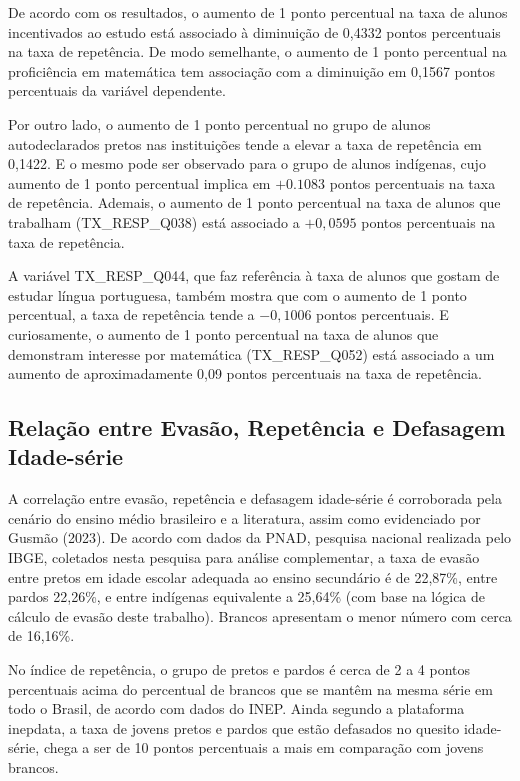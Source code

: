 \documentclass[english, spanish, brazilian]{RBIEarticle} %
\begin{document}
De acordo com os resultados, o aumento de 1 ponto percentual na taxa de alunos incentivados ao estudo está associado à diminuição de 0,4332 pontos percentuais na taxa de repetência. De modo semelhante, o aumento de 1 ponto percentual na proficiência em matemática tem associação com a diminuição em 0,1567 pontos percentuais da variável dependente.

Por outro lado, o aumento de 1 ponto percentual no grupo de alunos autodeclarados pretos nas instituições tende a elevar a taxa de repetência em 0,1422. E o mesmo pode ser observado para o grupo de alunos indígenas, cujo aumento de 1 ponto percentual implica em $+0.1083$ pontos percentuais na taxa de repetência. Ademais, o aumento de 1 ponto percentual na taxa de alunos que trabalham (TX\_RESP\_Q038) está associado a $+0,0595$ pontos percentuais na taxa de repetência.

A variável TX\_RESP\_Q044, que faz referência à taxa de alunos que gostam de estudar língua portuguesa, também mostra que com o aumento de 1 ponto percentual, a taxa de repetência tende a $-0,1006$ pontos percentuais. E curiosamente, o aumento de 1 ponto percentual na taxa de alunos que demonstram interesse por matemática (TX\_RESP\_Q052) está associado a um aumento de aproximadamente 0,09 pontos percentuais na taxa de repetência.

\subsection{Relação entre Evasão, Repetência e Defasagem Idade-série}

A correlação entre evasão, repetência e defasagem idade-série é corroborada pela cenário do ensino médio brasileiro e a literatura, assim como evidenciado por Gusmão (2023). De acordo com dados da PNAD, pesquisa nacional realizada pelo IBGE, coletados nesta pesquisa para análise complementar, a taxa de evasão entre pretos em idade escolar adequada ao ensino secundário é de 22,87\%, entre pardos 22,26\%, e entre indígenas equivalente a 25,64\% (com base na lógica de cálculo de evasão deste trabalho). Brancos apresentam o menor número com cerca de 16,16\%. 

No índice de repetência, o grupo de pretos e pardos é cerca de 2 a 4 pontos percentuais acima do percentual de brancos que se mantêm na mesma série em todo o Brasil, de acordo com dados do INEP. Ainda segundo a plataforma inepdata, a taxa de jovens pretos e pardos que estão defasados no quesito idade-série, chega a ser de 10 pontos percentuais a mais em comparação com jovens brancos.
\end{document}
